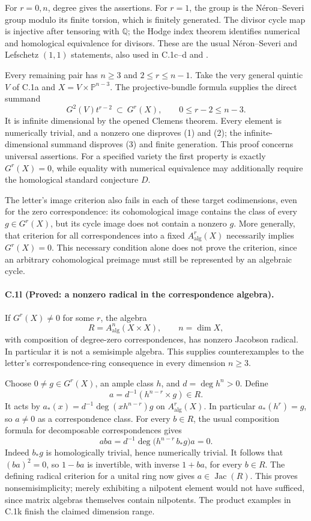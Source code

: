 For $r=0,n$, degree gives the assertions. For $r=1$, the group is
the N\'eron--Severi group modulo its finite torsion, which is finitely
generated. The divisor cycle map is injective after tensoring with
$\mathbb Q$; the Hodge index theorem identifies numerical and
homological equivalence for divisors. These are the usual
N\'eron--Severi and Lefschetz $(1,1)$ statements, also used in
C.1c--d and \citet[\S3, especially 3.4 and 3.10]{cyKleiman1968}.

Every remaining pair has $n\ge3$ and $2\le r\le n-1$. Take the
very general quintic $V$ of C.1a and
$X=V\times\mathbb P^{n-3}$. The projective-bundle formula supplies
the direct summand
\[
 G^2(V)t^{r-2}\ \subset\ G^r(X),
 \qquad 0\le r-2\le n-3.
\]
It is infinite dimensional by the opened Clemens theorem. Every
element is numerically trivial, and a nonzero one disproves (1) and
(2); the infinite-dimensional summand disproves (3) and finite
generation. This proof concerns universal assertions. For a specified
variety the first property is exactly $G^r(X)=0$, while equality with
numerical equivalence may additionally require the homological
standard conjecture $D$.

The letter's image criterion also fails in each of these target
codimensions, even for the zero correspondence: its cohomological
image contains the class of every $g\in G^r(X)$, but its cycle image
does not contain a nonzero $g$. More generally, that criterion for
all correspondences into a fixed $A^r_{\mathrm{alg}}(X)$ necessarily
implies $G^r(X)=0$. This necessary condition alone does not prove
the criterion, since an arbitrary cohomological preimage must still
be represented by an algebraic cycle.

\paragraph{C.1l (Proved: a nonzero radical in the correspondence algebra).}
If $G^r(X)\ne0$ for some $r$, the algebra
\[
 R=A^{n}_{\mathrm{alg}}(X\times X),\qquad n=\dim X,
\]
with composition of degree-zero correspondences, has nonzero
Jacobson radical. In particular it is not a semisimple algebra.
This supplies counterexamples to the letter's correspondence-ring
consequence in every dimension $n\ge3$.

Choose $0\ne g\in G^r(X)$, an ample class $h$, and
$d=\deg h^n>0$. Define
\[
 a=d^{-1}(h^{n-r}\times g)\in R.
\]
It acts by
$a_*(x)=d^{-1}\deg(xh^{n-r})g$ on $A^r_{\mathrm{alg}}(X)$.
In particular $a_*(h^r)=g$, so $a\ne0$ as a correspondence class.
For every $b\in R$, the usual composition formula for decomposable
correspondences gives
\[
 aba=d^{-1}\deg\bigl(h^{n-r}\,b_*g\bigr)a=0.
\]
Indeed $b_*g$ is homologically trivial, hence numerically trivial.
It follows that $(ba)^2=0$, so $1-ba$ is invertible, with inverse
$1+ba$, for every $b\in R$. The defining radical criterion for a
unital ring now gives $a\in\operatorname{Jac}(R)$. This proves
nonsemisimplicity; merely exhibiting a nilpotent element would not
have sufficed, since matrix algebras themselves contain nilpotents.
The product examples in C.1k finish the claimed dimension range.

